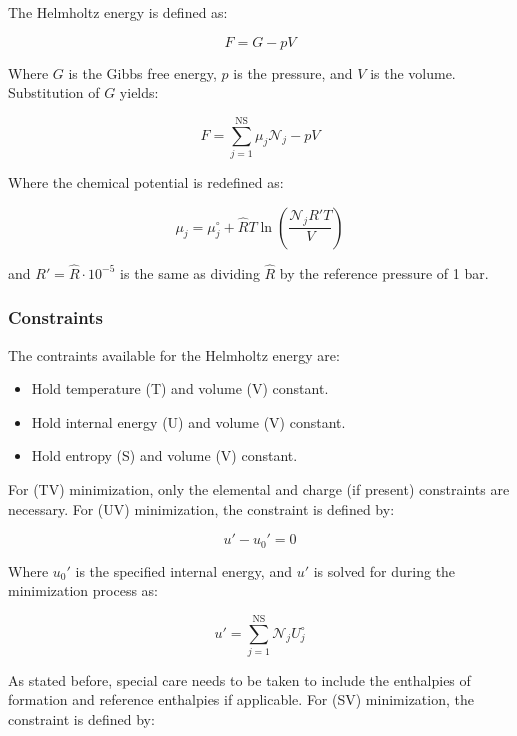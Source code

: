 \documentclass[10pt]{article}
\begin{document}
\begin{flushleft}
The Helmholtz energy is defined as:

\begin{equation}
    F = G - pV
\end{equation}

Where $G$ is the Gibbs free energy, $p$ is the pressure, and $V$ is the volume. Substitution of $G$ yields:

\begin{equation}
    F = \sum_{j=1}^\text{NS} \mu_j \mathcal{N}_j - pV
\end{equation}

Where the chemical potential is redefined as:

\begin{equation}
    \mu_j = \mu_j^\circ + \hat{R}T \ln\left( \frac{\mathcal{N}_j R'T}{V} \right)
    \label{chempotF}
\end{equation}

and $R' = \hat{R} \cdot 10^{-5}$ is the same as dividing $\hat{R}$ by the reference pressure of 1 bar. 

\subsubsection{Constraints}
The contraints available for the Helmholtz energy are:

\begin{itemize}
\item Hold temperature (T) and volume (V) constant.
\item Hold internal energy (U) and volume (V) constant.
\item Hold entropy (S) and volume (V) constant.
\end{itemize}

For (TV) minimization, only the elemental and charge (if present) constraints are necessary. For (UV) minimization, the constraint is defined by:

\begin{equation}
    u' - u_0' = 0
\end{equation}

Where $u_0'$ is the specified internal energy, and $u'$ is solved for during the minimization process as:

\begin{equation}
    u' = \sum_{j=1}^\text{NS} \mathcal{N}_j U_j^\circ
\end{equation}

As stated before, special care needs to be taken to include the enthalpies of formation and reference enthalpies if applicable. For (SV) minimization, the constraint is defined by:


\end{flushleft}
\end{document}
